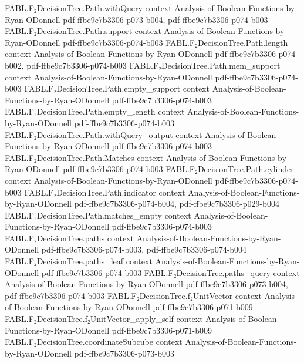 \begin{theorem}
  {FABL.F₂DecisionTree.Path.withQuery}
  {context}
  {Analysis-of-Boolean-Functions-by-Ryan-ODonnell}
  {pdf-ffbe9c7b3306-p073-b004,
    pdf-ffbe9c7b3306-p074-b003}
\proofstep
  {FABL.F₂DecisionTree.Path.support}
  {context}
  {Analysis-of-Boolean-Functions-by-Ryan-ODonnell}
  {pdf-ffbe9c7b3306-p074-b003}
\proofstep
  {FABL.F₂DecisionTree.Path.length}
  {context}
  {Analysis-of-Boolean-Functions-by-Ryan-ODonnell}
  {pdf-ffbe9c7b3306-p074-b002,
    pdf-ffbe9c7b3306-p074-b003}
\proofstep
  {FABL.F₂DecisionTree.Path.mem_support}
  {context}
  {Analysis-of-Boolean-Functions-by-Ryan-ODonnell}
  {pdf-ffbe9c7b3306-p074-b003}
\proofstep
  {FABL.F₂DecisionTree.Path.empty_support}
  {context}
  {Analysis-of-Boolean-Functions-by-Ryan-ODonnell}
  {pdf-ffbe9c7b3306-p074-b003}
\proofstep
  {FABL.F₂DecisionTree.Path.empty_length}
  {context}
  {Analysis-of-Boolean-Functions-by-Ryan-ODonnell}
  {pdf-ffbe9c7b3306-p074-b003}
\proofstep
  {FABL.F₂DecisionTree.Path.withQuery_output}
  {context}
  {Analysis-of-Boolean-Functions-by-Ryan-ODonnell}
  {pdf-ffbe9c7b3306-p074-b003}
\proofstep
  {FABL.F₂DecisionTree.Path.Matches}
  {context}
  {Analysis-of-Boolean-Functions-by-Ryan-ODonnell}
  {pdf-ffbe9c7b3306-p074-b003}
\proofstep
  {FABL.F₂DecisionTree.Path.cylinder}
  {context}
  {Analysis-of-Boolean-Functions-by-Ryan-ODonnell}
  {pdf-ffbe9c7b3306-p074-b003}
\proofstep
  {FABL.F₂DecisionTree.Path.indicator}
  {context}
  {Analysis-of-Boolean-Functions-by-Ryan-ODonnell}
  {pdf-ffbe9c7b3306-p074-b004,
    pdf-ffbe9c7b3306-p029-b004}
\proofstep
  {FABL.F₂DecisionTree.Path.matches_empty}
  {context}
  {Analysis-of-Boolean-Functions-by-Ryan-ODonnell}
  {pdf-ffbe9c7b3306-p074-b003}
\proofstep
  {FABL.F₂DecisionTree.paths}
  {context}
  {Analysis-of-Boolean-Functions-by-Ryan-ODonnell}
  {pdf-ffbe9c7b3306-p074-b003,
    pdf-ffbe9c7b3306-p074-b004}
\proofstep
  {FABL.F₂DecisionTree.paths_leaf}
  {context}
  {Analysis-of-Boolean-Functions-by-Ryan-ODonnell}
  {pdf-ffbe9c7b3306-p074-b003}
\proofstep
  {FABL.F₂DecisionTree.paths_query}
  {context}
  {Analysis-of-Boolean-Functions-by-Ryan-ODonnell}
  {pdf-ffbe9c7b3306-p073-b004,
    pdf-ffbe9c7b3306-p074-b003}
\proofstep
  {FABL.F₂DecisionTree.f₂UnitVector}
  {context}
  {Analysis-of-Boolean-Functions-by-Ryan-ODonnell}
  {pdf-ffbe9c7b3306-p071-b009}
\proofstep
  {FABL.F₂DecisionTree.f₂UnitVector_apply_self}
  {context}
  {Analysis-of-Boolean-Functions-by-Ryan-ODonnell}
  {pdf-ffbe9c7b3306-p071-b009}
\proofstep
  {FABL.F₂DecisionTree.coordinateSubcube}
  {context}
  {Analysis-of-Boolean-Functions-by-Ryan-ODonnell}
  {pdf-ffbe9c7b3306-p073-b003}

\end{theorem}

